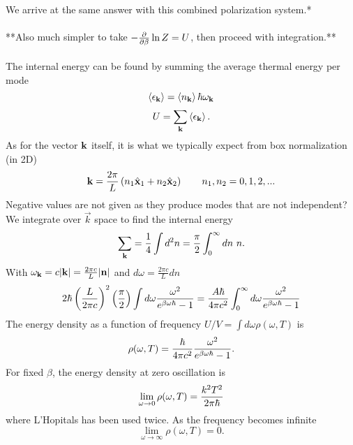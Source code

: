 \documentclass[10pt,letterpaper]{article}
\begin{document}
	We arrive at the same answer with this combined polarization system.*
	\\ \\
	**Also much simpler to take $-\frac{\partial}{\partial\beta}\ln Z = U$, then proceed with integration.**
	\\ \\
	The internal energy can be found by summing the average thermal energy per mode
	\[
		\braket{\epsilon_{\mathbf{k}}} = \braket{n_{\mathbf{k}}}\hbar\omega_{\mathbf{k}}
	\]
	\[
		U = \sum_{\mathbf{k}} \braket{\epsilon_{\mathbf{k}}}.
	\]
	As for the vector $\mathbf{k}$ itself, it is what we typically expect from box normalization (in 2D)
	\[
		\mathbf{k} = \frac{2\pi}{L}\left(n_1 \hat{\mathbf{x}}_1 + n_2 \hat{\mathbf{x}}_2\right)\qquad n_1,n_2 = 0,1,2,...
	\]
	Negative values are not given as they produce modes that are not independent? We integrate
	over $\vec k$ space to find the internal energy
	\[
		\sum_{\mathbf{k}} = \frac{1}{4}\int d^2n = \frac{\pi}{2} \int_0^\infty dn\ n.
	\]
	With $\omega_{\mathbf{k}} = c|\mathbf{k}| = \frac{2\pi c}{L}|\mathbf{n}|$ and $d\omega = \frac{2\pi c}{L} dn$
	\[
		2\hbar \left(\frac{L}{2\pi c}\right)^2\left(\frac{\pi}{2}\right) \int d\omega \frac{\omega^2}{e^{\beta\omega\hbar}-1} = 
		\frac{A\hbar}{4\pi c^2} \int_0^\infty d\omega \frac{\omega^2}{e^{\beta\omega\hbar}-1} 
	\]
	The energy density as a function of frequency $U/V = \int d\omega \rho(\omega,T)$ is 
	\[
		\rho(\omega,T) = \frac{\hbar}{4\pi c^2}\frac{\omega^2}{e^{\beta\omega\hbar}-1}.
	\]
	For fixed $\beta$, the energy density at zero oscillation is
	\[
		\lim_{\omega\to 0} \rho(\omega,T) = \frac{k^2 T^2}{2\pi \hbar}
	\]
	where L'Hopitals has been used twice. As the frequency becomes infinite
	\[
		\lim_{\omega\to\infty} \rho(\omega,T) = 0.
	\]
	\\ \\
	
\end{document}
